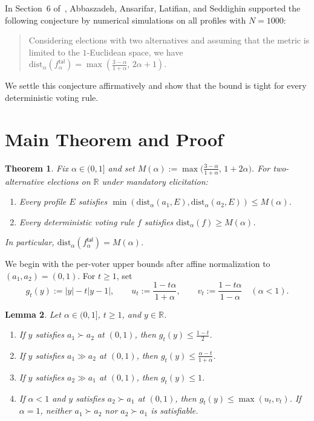 \documentclass[11pt]{article}
\newtheorem{theorem}{Theorem}
\newtheorem{lemma}[theorem]{Lemma}
\begin{document}
In Section~6 of~\cite{AALS2026}, Abbaszadeh, Ansarifar, Latifian, and
Seddighin supported the following conjecture by numerical simulations on all
profiles with $N = 1000$:
\begin{quote}
Considering elections with two alternatives and assuming that the metric is
limited to the $1$-Euclidean space, we have
$\mathrm{dist}_\alpha(f^{\mathsf{tal}}_\alpha) = \max\!\left(\frac{3 - \alpha}{1 + \alpha},\, 2\alpha + 1\right)$.
\end{quote}

We settle this conjecture affirmatively and show that the bound is tight for
every deterministic voting rule.

\section{Main Theorem and Proof}

\begin{theorem}\label{thm:main}
Fix $\alpha \in (0, 1]$ and set
$M(\alpha) := \max\bigl(\frac{3 - \alpha}{1 + \alpha},\, 1 + 2\alpha\bigr)$.
For two-alternative elections on $\mathbb{R}$ under mandatory elicitation:
\begin{enumerate}
\item Every profile $E$ satisfies
$\min(\mathrm{dist}_\alpha(a_1, E), \mathrm{dist}_\alpha(a_2, E)) \le M(\alpha)$.
\item Every deterministic voting rule $f$ satisfies
$\mathrm{dist}_\alpha(f) \ge M(\alpha)$.
\end{enumerate}
In particular, $\mathrm{dist}_\alpha(f^{\mathsf{tal}}_\alpha) = M(\alpha)$.
\end{theorem}

We begin with the per-voter upper bounds after affine normalization to
$(a_1, a_2) = (0, 1)$. For $t \ge 1$, set
\[
g_t(y) := |y| - t|y - 1|, \qquad
u_t := \frac{1 - t\alpha}{1 + \alpha}, \qquad
v_t := \frac{1 - t\alpha}{1 - \alpha} \quad (\alpha < 1).
\]

\begin{lemma}\label{lem:per-agent}
Let $\alpha \in (0, 1]$, $t \ge 1$, and $y \in \mathbb{R}$.
\begin{enumerate}
\item If $y$ satisfies $a_1 \succ a_2$ at $(0, 1)$, then
$g_t(y) \le \frac{1 - t}{2}$.
\item If $y$ satisfies $a_1 \gg a_2$ at $(0, 1)$, then
$g_t(y) \le \frac{\alpha - t}{1 + \alpha}$.
\item If $y$ satisfies $a_2 \gg a_1$ at $(0, 1)$, then $g_t(y) \le 1$.
\item If $\alpha < 1$ and $y$ satisfies $a_2 \succ a_1$ at $(0, 1)$, then
$g_t(y) \le \max(u_t, v_t)$. If $\alpha = 1$, neither $a_1 \succ a_2$ nor
$a_2 \succ a_1$ is satisfiable.
\end{enumerate}
\end{lemma}
\end{document}
